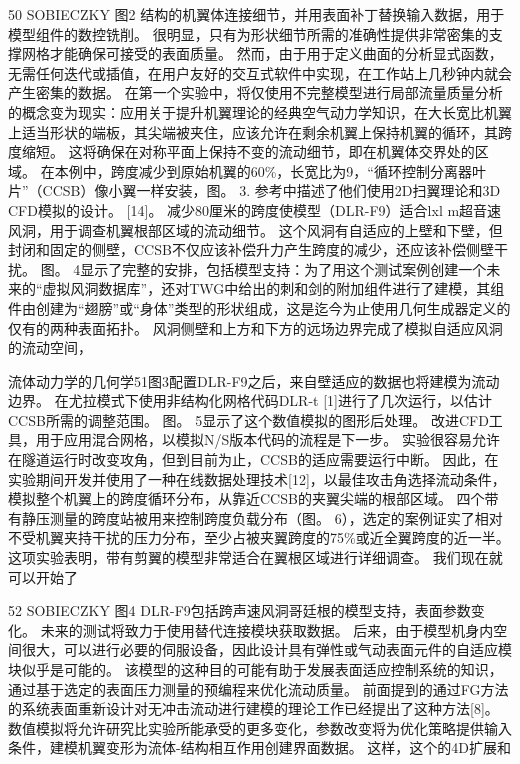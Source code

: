 \documentclass[UTF8,11pt,a4paper,openany,fontset=fandol]{ctexbook}
\begin{document}
50 SOBIECZKY 图2 结构的机翼体连接细节，并用表面补丁替换输入数据，用于模型组件的数控铣削。 很明显，只有为形状细节所需的准确性提供非常密集的支撑网格才能确保可接受的表面质量。 然而，由于用于定义曲面的分析显式函数，无需任何迭代或插值，在用户友好的交互式软件中实现，在工作站上几秒钟内就会产生密集的数据。 在第一个实验中，将仅使用不完整模型进行局部流量质量分析的概念变为现实：应用关于提升机翼理论的经典空气动力学知识，在大长宽比机翼上适当形状的端板，其尖端被夹住，应该允许在剩余机翼上保持机翼的循环，其跨度缩短。 这将确保在对称平面上保持不变的流动细节，即在机翼体交界处的区域。 在本例中，跨度减少到原始机翼的60\%，长宽比为9，“循环控制分离器叶片”（CCSB）像小翼一样安装，图。 3. 参考中描述了他们使用2D扫翼理论和3D CFD模拟的设计。 [14]。 减少80厘米的跨度使模型（DLR-F9）适合lxl m超音速风洞，用于调查机翼根部区域的流动细节。 这个风洞有自适应的上壁和下壁，但封闭和固定的侧壁，CCSB不仅应该补偿升力产生跨度的减少，还应该补偿侧壁干扰。 图。 4显示了完整的安排，包括模型支持：为了用这个测试案例创建一个未来的“虚拟风洞数据库”，还对TWG中给出的刺和剑的附加组件进行了建模，其组件由创建为“翅膀”或“身体”类型的形状组成，这是迄今为止使用几何生成器定义的仅有的两种表面拓扑。 风洞侧壁和上方和下方的远场边界完成了模拟自适应风洞的流动空间，

流体动力学的几何学51图3配置DLR-F9之后，来自壁适应的数据也将建模为流动边界。 在尤拉模式下使用非结构化网格代码DLR-t [1]进行了几次运行，以估计CCSB所需的调整范围。 图。 5显示了这个数值模拟的图形后处理。 改进CFD工具，用于应用混合网格，以模拟N/S版本代码的流程是下一步。 实验很容易允许在隧道运行时改变攻角，但到目前为止，CCSB的适应需要运行中断。 因此，在实验期间开发并使用了一种在线数据处理技术[12]，以最佳攻击角选择流动条件，模拟整个机翼上的跨度循环分布，从靠近CCSB的夹翼尖端的根部区域。 四个带有静压测量的跨度站被用来控制跨度负载分布（图。 6），选定的案例证实了相对不受机翼夹持干扰的压力分布，至少占被夹翼跨度的75\%或近全翼跨度的近一半。 这项实验表明，带有剪翼的模型非常适合在翼根区域进行详细调查。 我们现在就可以开始了

52 SOBIECZKY 图4 DLR-F9包括跨声速风洞哥廷根的模型支持，表面参数变化。 未来的测试将致力于使用替代连接模块获取数据。 后来，由于模型机身内空间很大，可以进行必要的伺服设备，因此设计具有弹性或气动表面元件的自适应模块似乎是可能的。 该模型的这种目的可能有助于发展表面适应控制系统的知识，通过基于选定的表面压力测量的预编程来优化流动质量。 前面提到的通过FG方法的系统表面重新设计对无冲击流动进行建模的理论工作已经提出了这种方法[8]。 数值模拟将允许研究比实验所能承受的更多变化，参数改变将为优化策略提供输入条件，建模机翼变形为流体-结构相互作用创建界面数据。 这样，这个的4D扩展和
\end{document}
